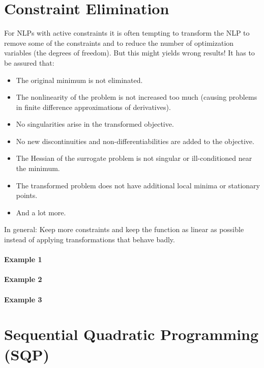 	\section{Constraint Elimination}
		For NLPs with active constraints it is often tempting to transform the NLP to remove some of the constraints and to reduce the number of optimization variables (the degrees of freedom). But this might yields wrong results! It has to be assured that:
		\begin{itemize}
			\item The original minimum is not eliminated.
			\item The nonlinearity of the problem is not increased too much (causing problems in finite difference approximations of derivatives).
			\item No singularities arise in the transformed objective.
			\item No new discontinuities and non-differentiabilities are added to the objective.
			\item The Hessian of the surrogate problem is not singular or ill-conditioned near the minimum.
			\item The transformed problem does not have additional local minima or stationary points.
			\item And a lot more.
		\end{itemize}
		In general: Keep more constraints and keep the function as linear as possible instead of applying transformations that behave badly.

		\paragraph{Example 1} %

		\paragraph{Example 2} %

		\paragraph{Example 3} %

	\section{Sequential Quadratic Programming (SQP)}
		\label{sec:sqp}

